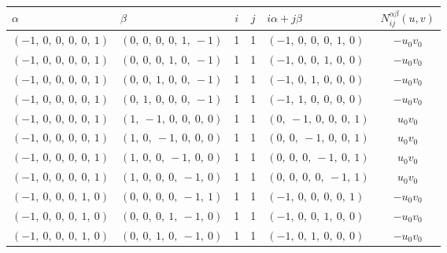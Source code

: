 \documentclass[11pt]{article}
\newcommand{\noi}{\noindent}
\theoremstyle{definition}
\begin{document}
\noi \noindent \begin{longtable}{|l|l|c|c|l|c|}
    \hline
    $\alpha$ & $\beta$ & $i$ & $j$ &  $i\alpha + j\beta$ & $N_{ij}^{\alpha\beta}(u,v)$ \\
    \hline
    \endhead
    $\left( -1, \  0, \  0, \  0, \  0, \  1\right)$ & $\left( 0, \  0, \  0, \  0, \  1, \  -1\right)$ & 1 & 1 & $\left( -1, \  0, \  0, \  0, \  1, \  0\right)$ & $- u_{0} v_{0}$ \\
    \hline
    $\left( -1, \  0, \  0, \  0, \  0, \  1\right)$ & $\left( 0, \  0, \  0, \  1, \  0, \  -1\right)$ & 1 & 1 & $\left( -1, \  0, \  0, \  1, \  0, \  0\right)$ & $- u_{0} v_{0}$ \\
    \hline
    $\left( -1, \  0, \  0, \  0, \  0, \  1\right)$ & $\left( 0, \  0, \  1, \  0, \  0, \  -1\right)$ & 1 & 1 & $\left( -1, \  0, \  1, \  0, \  0, \  0\right)$ & $- u_{0} v_{0}$ \\
    \hline
    $\left( -1, \  0, \  0, \  0, \  0, \  1\right)$ & $\left( 0, \  1, \  0, \  0, \  0, \  -1\right)$ & 1 & 1 & $\left( -1, \  1, \  0, \  0, \  0, \  0\right)$ & $- u_{0} v_{0}$ \\
    \hline
    $\left( -1, \  0, \  0, \  0, \  0, \  1\right)$ & $\left( 1, \  -1, \  0, \  0, \  0, \  0\right)$ & 1 & 1 & $\left( 0, \  -1, \  0, \  0, \  0, \  1\right)$ & $u_{0} v_{0}$ \\
    \hline
    $\left( -1, \  0, \  0, \  0, \  0, \  1\right)$ & $\left( 1, \  0, \  -1, \  0, \  0, \  0\right)$ & 1 & 1 & $\left( 0, \  0, \  -1, \  0, \  0, \  1\right)$ & $u_{0} v_{0}$ \\
    \hline
    $\left( -1, \  0, \  0, \  0, \  0, \  1\right)$ & $\left( 1, \  0, \  0, \  -1, \  0, \  0\right)$ & 1 & 1 & $\left( 0, \  0, \  0, \  -1, \  0, \  1\right)$ & $u_{0} v_{0}$ \\
    \hline
    $\left( -1, \  0, \  0, \  0, \  0, \  1\right)$ & $\left( 1, \  0, \  0, \  0, \  -1, \  0\right)$ & 1 & 1 & $\left( 0, \  0, \  0, \  0, \  -1, \  1\right)$ & $u_{0} v_{0}$ \\
    \hline
    $\left( -1, \  0, \  0, \  0, \  1, \  0\right)$ & $\left( 0, \  0, \  0, \  0, \  -1, \  1\right)$ & 1 & 1 & $\left( -1, \  0, \  0, \  0, \  0, \  1\right)$ & $- u_{0} v_{0}$ \\
    \hline
    $\left( -1, \  0, \  0, \  0, \  1, \  0\right)$ & $\left( 0, \  0, \  0, \  1, \  -1, \  0\right)$ & 1 & 1 & $\left( -1, \  0, \  0, \  1, \  0, \  0\right)$ & $- u_{0} v_{0}$ \\
    \hline
    $\left( -1, \  0, \  0, \  0, \  1, \  0\right)$ & $\left( 0, \  0, \  1, \  0, \  -1, \  0\right)$ & 1 & 1 & $\left( -1, \  0, \  1, \  0, \  0, \  0\right)$ & $- u_{0} v_{0}$ \\

\end{longtable}
\end{document}
